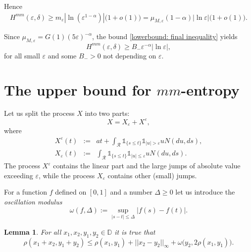 \documentclass[12pt]{article}
\newcommand\D{\mathbb D}
\let\de\delta
\let\ep\varepsilon
\newcommand\ro{\rho}
\newcommand\RR{\mathcal R}
\let\le\leqslant
\let\ge\geqslant
\newtheorem{lemma}[theorem]{Lemma}
\theoremstyle{definition}
\begin{document}
Hence
\begin{equation}\label{lowerbound: final inequality}
    \begin{gathered}
        H^{mm}(\ep,\de)\ge m_\ep |\ln(\ep^{1-\alpha})|\big(1 + o(1)\big) = \mu_{M,\ep}(1-\alpha)|\ln\ep|\big(1+o(1)\big). 
    \end{gathered}
\end{equation}

Since $\mu_{M,\ep} = G(1)(5\ep)^{-\alpha}$, 
the bound \eqref{lowerbound: final inequality} yields 
\begin{equation*}
    H^{mm}(\ep, \de) \ge B_-\ep^{-\alpha}|\ln\ep|,
\end{equation*}
for all small $\ep$ and some $B_->0$ not depending on $\ep$.


\section{The upper bound for $mm$-entropy} 
\label{s:upper}

Let us split  the process $X$ into two parts:
\begin{equation} \label{split}
     X = X_\ep + X^\ep,
\end{equation}
where
\begin{eqnarray*}
                X^\ep(t) &:=& at + \int_{\RR}\mathds{1}_{\{s \le t\}}\mathds{1}_{|u| > \ep}u N(du, ds),
\\
                X_\ep(t) &:=& \int_{\RR}\mathds{1}_{\{s \le t\}}\mathds{1}_{|u| \le \ep}u N(du, ds).
\end{eqnarray*}
The process $X^\ep$ contains the linear part  and the large jumps of absolute value exceeding $\ep$, 
while the process $X_\ep$  contains other (small) jumps.


For a function $f$ defined on $[0,1]$ and a number $\Delta \ge 0$ let us introduce
the {\it oscillation modulus}
\[ 
        \omega(f, \Delta) := \sup_{|s - t| \le \Delta} |f(s) - f(t)|.
\]
        
\begin{lemma}\label{mainlemma1}
For all $x_1,x_2,y_1, y_2\in \D$ it is true that
\[ 
    \ro(x_1 + x_2, y_1 + y_2) 
    \le \ro(x_1, y_1) + ||x_2 - y_2||_\infty + \omega\big(y_2, 2\ro(x_1, y_1)\big).
\]
\end{lemma}
    
\end{document}
